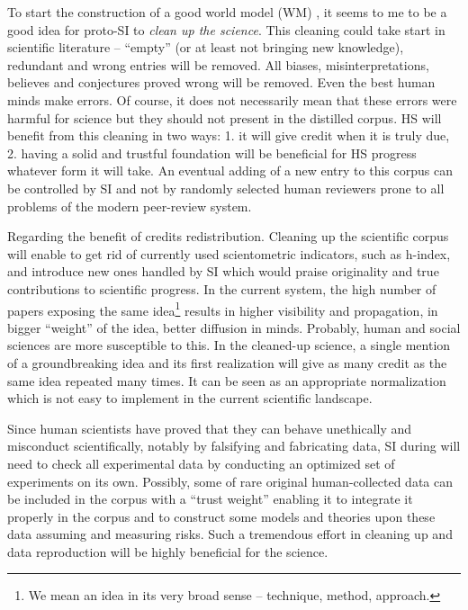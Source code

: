 \documentclass[a4paper,11pt]{article}
\begin{document}
To start the construction of a good world model (WM) , it seems to me to be a good idea for proto-SI  to \emph{clean up the science}. This cleaning could take start in scientific literature -- ``empty'' (or at least not bringing new knowledge), redundant and wrong entries will be removed. All biases, misinterpretations, believes and conjectures proved wrong will be removed.  Even the best human minds make errors. Of course, it does not necessarily mean that these errors were harmful for science but they should not present in the distilled corpus. HS will benefit from this cleaning in two ways: 1. it will give credit when it is truly due, 2. having a solid and trustful foundation will be beneficial for HS progress whatever form it will take. An eventual adding of a new entry to this corpus can be controlled by SI and not by randomly selected human reviewers prone to all problems of the modern peer-review system.

Regarding the benefit of credits redistribution. Cleaning up the scientific corpus will enable to get rid of currently used scientometric indicators, such as h-index, and introduce new ones handled by SI which would praise originality and true contributions to scientific progress. In the current system, the high number of papers exposing the same idea\footnote{We mean an idea in its very broad sense -- technique, method, approach.} results in higher visibility and propagation, in bigger ``weight'' of the idea, better diffusion in minds. Probably, human and social sciences are more susceptible to this. In the cleaned-up science, a single mention of a groundbreaking idea and its first realization will give as many credit as the same idea repeated many times. It can be seen as an appropriate normalization which is not easy to implement in the current scientific landscape.

Since human scientists have proved that they can behave unethically and misconduct scientifically, notably by falsifying and fabricating data, SI during will need to check all experimental data by conducting an optimized set of experiments on its own. Possibly, some of rare original human-collected data can be included in the corpus with a ``trust weight'' enabling it to integrate it properly in the corpus and to construct some models and theories upon these data assuming and measuring risks. Such a tremendous effort in cleaning up and data reproduction will be highly beneficial for the science.
\end{document}
